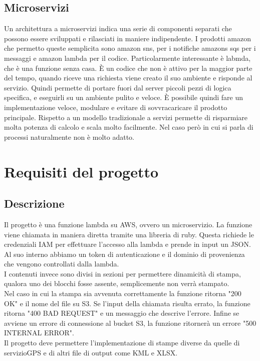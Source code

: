 \documentclass[12pt]{article}
\begin{document}
\subsection{Microservizi}
Un architettura a microservizi indica una serie di componenti separati che 
possono essere sviluppati e rilasciati in maniere indipendente. 
I prodotti amazon che permetto queste semplicita sono amazon sns, per i notifiche
amazons sqs per i messaggi e amazon lambda per il codice. 
Particolarmente interessante è labmda, che è una funzione senza casa.
È un codice che non è attivo per la maggior parte del tempo, quando riceve una 
richiesta viene creato il suo ambiente e risponde al servizio. 
Quindi permette di portare fuori dal server piccoli pezzi di logica specifica, 
e eseguirli su un ambiente pulito e veloce. 
È possibile quindi fare un implementazione veloce, modulare e evitare di 
sovvracaricare il prodotto principale. 
Rispetto a un modello tradizionale a servizi permette di risparmiare molta 
potenza di calcolo e scala molto facilmente. 
Nel caso però in cui si parla di processi naturalmente non è molto adatto.

\section{Requisiti del progetto}
\subsection{Descrizione}
Il progetto è una funzione lambda su AWS, ovvero un microservizio. La funzione 
viene chiamata in maniera diretta tramite una libreria di ruby.
Questa richiede le credenziali IAM per effettuare l'accesso alla lambda e prende 
in input un JSON. Al suo interno abbiamo un token di autenticazione e il dominio 
di provenienza che vengono controllati dalla lambda. 
\\ I contenuti invece sono divisi in sezioni per permettere dinamicità di stampa, 
qualora uno dei blocchi fosse assente, semplicemente non verrà stampato. 
\\ Nel caso in cui la stampa sia avvenuta correttamente la funzione ritorna 
"200 OK"
e il nome del file su S3. Se l'input della chiamata risulta errato, la funzione ritorna 
"400 BAD REQUEST"
e un messaggio che descrive l'errore. Infine se avviene un errore di connessione 
al bucket S3, la funzione ritornerà un errore "500 INTERNAL ERROR".    
\\ Il progetto deve permettere l'implementazione di stampe diverse da quelle di servizioGPS
e di altri file di output come KML e XLSX. 
\end{document}
